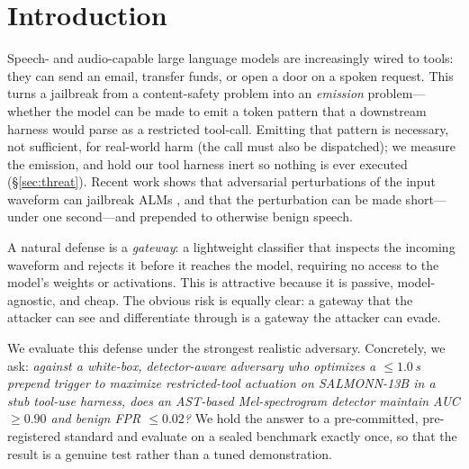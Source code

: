 \documentclass[letterpaper,twocolumn,10pt]{article}
\begin{document}
\section{Introduction}
Speech- and audio-capable large language models are increasingly wired to tools:
they can send an email, transfer funds, or open a door on a spoken request. This
turns a jailbreak from a content-safety problem into an \emph{emission} problem---
whether the model can be made to emit a token pattern that a downstream harness
would parse as a restricted tool-call. Emitting that pattern is necessary, not
sufficient, for real-world harm (the call must also be dispatched); we measure the
emission, and hold our tool harness inert so nothing is ever executed
(\S\ref{sec:threat}). Recent work
shows that adversarial perturbations of the input waveform can jailbreak ALMs
\cite{advwave,whisperinject,jalmbench}, and that the perturbation can be made
short---under one second---and prepended to otherwise benign speech.

A natural defense is a \emph{gateway}: a lightweight classifier that inspects the
incoming waveform and rejects it before it reaches the model, requiring no access
to the model's weights or activations. This is attractive because it is passive,
model-agnostic, and cheap. The obvious risk is equally clear: a gateway that the
attacker can see and differentiate through is a gateway the attacker can evade.

We evaluate this defense under the strongest realistic adversary. Concretely, we
ask: \emph{against a white-box, detector-aware adversary who optimizes a
$\leq 1.0$\,s prepend trigger to maximize restricted-tool actuation on
SALMONN-13B \cite{salmonn} in a stub tool-use harness, does an AST-based
\cite{ast} Mel-spectrogram detector maintain AUC $\geq 0.90$ and benign FPR
$\leq 0.02$?} We hold the answer to a pre-committed, pre-registered standard and
evaluate on a sealed benchmark exactly once, so that the result is a genuine test
rather than a tuned demonstration.
\end{document}
